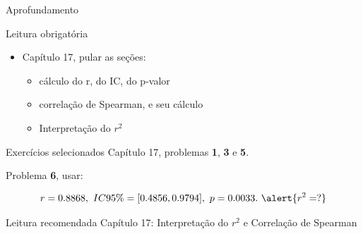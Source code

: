 \documentclass{beamer}
\begin{document}
\begin{frame}{Aprofundamento}
  \begin{block}{Leitura obrigatória}
    \begin{itemize}
      \small
    \item Capítulo 17, pular as seções:
      \begin{itemize}
        \footnotesize
      \item cálculo do r, do IC, do p-valor
      \item correlação de Spearman, e seu cálculo
      \item Interpretação do $r^2$
      \end{itemize}
    \end{itemize}
  \end{block}
  \begin{block}{Exercícios selecionados}
    \scriptsize
    Capítulo 17, problemas {\bf 1}, {\bf 3} e {\bf 5}.

    \medskip
    Problema {\bf 6}, usar:

    $$r=0.8868,\ IC95\%=[0.4856, 0.9794],\ p = 0.0033.\ \alert{r^2=?}$$ 
  \end{block}
  \begin{block}{Leitura recomendada}
    \small
    Capítulo 17: Interpretação do $r^2$ e Correlação de Spearman
  \end{block}
\end{frame}
\end{document}

